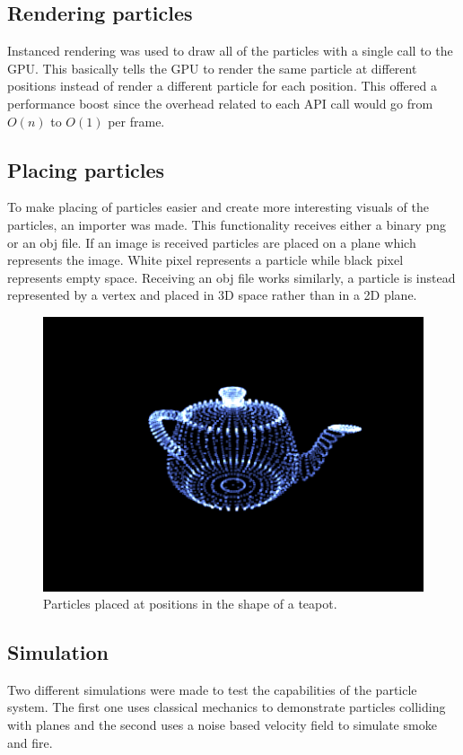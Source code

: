 \documentclass[report]{vgtc}
\begin{document}
\subsection{Rendering particles}
Instanced rendering was used to draw all of the particles with a single call to the GPU. This basically tells the GPU to render the same particle at different positions instead of render a different particle for each position. This offered a performance boost since the overhead related to each API call would go from \(O(n)\) to \(O(1)\) per frame.


\subsection{Placing particles}
To make placing of particles easier and create more interesting visuals of the particles, an importer was made. This functionality receives either a binary png or an obj file. If an image is received particles are placed on a plane which represents the image. White pixel represents a particle while black pixel represents empty space. 
Receiving an obj file works similarly, a particle is instead represented by a vertex and placed in 3D space rather than in a 2D plane.

\begin{figure}[H]
\includegraphics[scale=0.5]{img/teapot.png}
\caption{Particles placed at positions in the shape of a teapot.}
\end{figure}

\subsection{Simulation}
Two different simulations were made to test the capabilities of the particle system. The first one uses classical mechanics to demonstrate particles colliding with planes and the second uses a noise based velocity field to simulate smoke and fire. 
\end{document}
